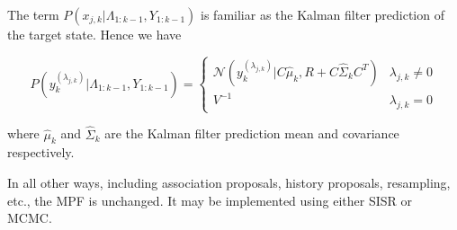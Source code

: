 The term $P(x_{j,k}|\Lambda_{1:k-1}, Y_{1:k-1})$ is familiar as the Kalman filter prediction of the target state. Hence we have

\begin{equation}
P(y_k^{(\lambda_{j,k})}|\Lambda_{1:k-1}, Y_{1:k-1}) = \begin{cases}
\mathcal{N}(y_k^{(\lambda_{j,k})}|C \hat{\mu}_k, R + C \hat{\Sigma}_k C^T) & \lambda_{j,k} \ne 0 \\
V^{-1} & \lambda_{j,k} = 0
\end{cases} 
\end{equation}

where $\hat{\mu}_k$ and $\hat{\Sigma}_k$ are the Kalman filter prediction mean and covariance respectively.

In all other ways, including association proposals, history proposals, resampling, etc., the MPF is unchanged. It may be implemented using either SISR or MCMC.
